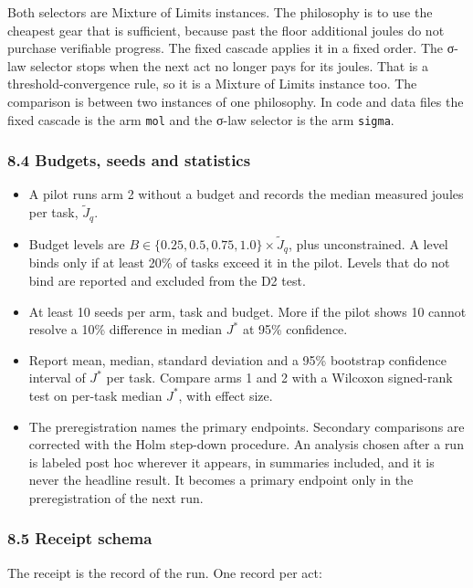 \documentclass[
  10pt,
]{article}
\providecommand{\tightlist}{%
  \setlength{\itemsep}{0pt}\setlength{\parskip}{0pt}}
\begin{document}
Both selectors are Mixture of Limits instances. The philosophy is to use
the cheapest gear that is sufficient, because past the floor additional
joules do not purchase verifiable progress. The fixed cascade applies it
in a fixed order. The σ-law selector stops when the next act no longer
pays for its joules. That is a threshold-convergence rule, so it is a
Mixture of Limits instance too. The comparison is between two instances
of one philosophy. In code and data files the fixed cascade is the arm
\texttt{mol} and the σ-law selector is the arm \texttt{sigma}.

\subsubsection{8.4 Budgets, seeds and
statistics}\label{budgets-seeds-and-statistics}

\begin{itemize}
\tightlist
\item
  A pilot runs arm 2 without a budget and records the median measured
  joules per task, \(\tilde J_q\).
\item
  Budget levels are
  \(B \in \{0.25, 0.5, 0.75, 1.0\} \times \tilde J_q\), plus
  unconstrained. A level binds only if at least 20\% of tasks exceed it
  in the pilot. Levels that do not bind are reported and excluded from
  the D2 test.
\item
  At least 10 seeds per arm, task and budget. More if the pilot shows 10
  cannot resolve a 10\% difference in median \(J^*\) at 95\% confidence.
\item
  Report mean, median, standard deviation and a 95\% bootstrap
  confidence interval of \(J^*\) per task. Compare arms 1 and 2 with a
  Wilcoxon signed-rank test on per-task median \(J^*\), with effect
  size.
\item
  The preregistration names the primary endpoints. Secondary comparisons
  are corrected with the Holm step-down procedure. An analysis chosen
  after a run is labeled post hoc wherever it appears, in summaries
  included, and it is never the headline result. It becomes a primary
  endpoint only in the preregistration of the next run.
\end{itemize}

\subsubsection{8.5 Receipt schema}\label{receipt-schema}

The receipt is the record of the run. One record per act:
\end{document}
